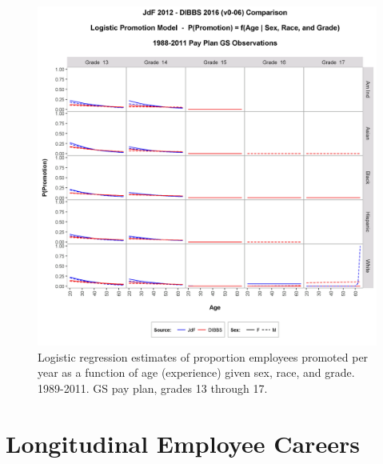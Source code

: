 \documentclass[10pt, letterpaper]{article}
\begin{document}
\begin{spacing}{1.0}
\begin{figure}[]
    \centering
    \includegraphics[width=6in, trim={0 0 0 1in}, clip]{PromotionSexRaceageGS13-17Model.png}
    \caption{Logistic regression estimates of proportion employees promoted per year as a function of age (experience) given sex, race, and grade.  1989-2011.  GS pay plan, grades 13 through 17.}
    \label{figure:PromotionSexRaceageGS13-17Model}
\end{figure}

\clearpage

\section{Longitudinal Employee Careers}


\end{spacing}
\end{document}
